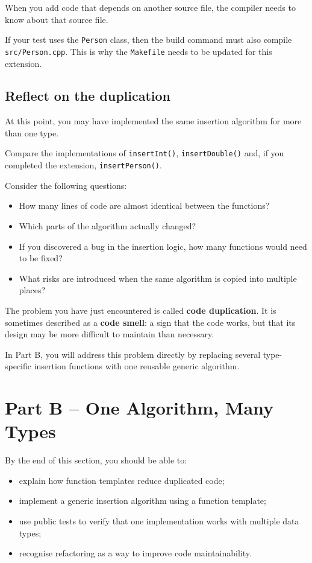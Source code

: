 \documentclass{csc2059practical}
\begin{document}
\begin{infobox}
When you add code that depends on another source file, the compiler needs to know about that source file.

If your test uses the \texttt{Person} class, then the build command must also compile \texttt{src/Person.cpp}. This is why the \texttt{Makefile} needs to be updated for this extension.
\end{infobox}

\subsection{Reflect on the duplication}

At this point, you may have implemented the same insertion algorithm for more than one type.

Compare the implementations of \texttt{insertInt()}, \texttt{insertDouble()} and, if you completed the extension, \texttt{insertPerson()}.

\begin{reflectionbox}
Consider the following questions:

\begin{itemize}
    \item How many lines of code are almost identical between the functions?
    \item Which parts of the algorithm actually changed?
    \item If you discovered a bug in the insertion logic, how many functions would need to be fixed?
    \item What risks are introduced when the same algorithm is copied into multiple places?
\end{itemize}
\end{reflectionbox}

The problem you have just encountered is called \textbf{code duplication}. It is sometimes described as a \textbf{code smell}: a sign that the code works, but that its design may be more difficult to maintain than necessary.

In Part B, you will address this problem directly by replacing several type-specific insertion functions with one reusable generic algorithm.


\section{Part B -- One Algorithm, Many Types}

\begin{learningoutcomes}
By the end of this section, you should be able to:
\begin{itemize}
    \item explain how function templates reduce duplicated code;
    \item implement a generic insertion algorithm using a function template;
    \item use public tests to verify that one implementation works with multiple data types;
    \item recognise refactoring as a way to improve code maintainability.
\end{itemize}
\end{learningoutcomes}
\end{document}
